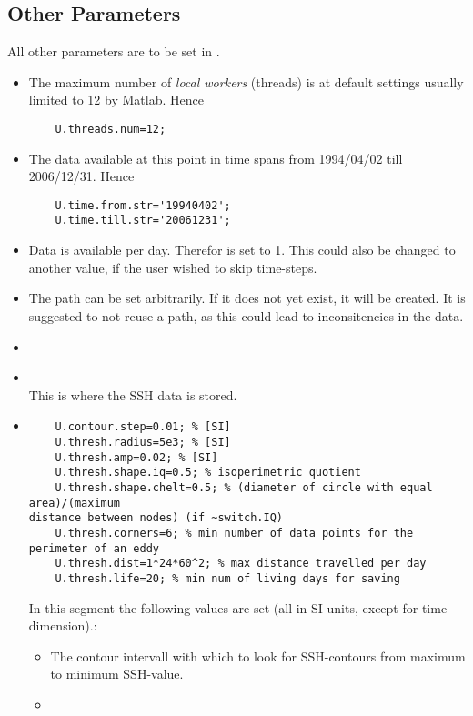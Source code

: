 \subsection{Other Parameters}
All other parameters are to be set in . 
\begin{itemize}
	\item 
	The maximum number of \textit{local workers} (threads) is at default settings
usually limited to 12 by Matlab. Hence 
 \begin{lstlisting}
 	U.threads.num=12;
 \end{lstlisting}
 \item 
 The data available at this point in time spans from 1994/04/02 till 2006/12/31.
Hence
 \begin{lstlisting}
 	U.time.from.str='19940402';
  	U.time.till.str='20061231';
 \end{lstlisting}
\item 
Data is available per day. Therefor  is set
to 1. This could also be changed to another value, if the user wished to skip
time-steps.
	\item \label{codeEx:data}
	The path  can be set arbitrarily. If it
does not yet exist, it will be created. It is suggested to not reuse a path,
as this could lead to inconsitencies in the data.
\item
{}
\item
{}\\
This is where the SSH data is stored.
\item
\begin{lstlisting}
	U.contour.step=0.01; % [SI]
	U.thresh.radius=5e3; % [SI]
	U.thresh.amp=0.02; % [SI]
	U.thresh.shape.iq=0.5; % isoperimetric quotient
	U.thresh.shape.chelt=0.5; % (diameter of circle with equal area)/(maximum
distance between nodes) (if ~switch.IQ) 
	U.thresh.corners=6; % min number of data points for the perimeter of an eddy
	U.thresh.dist=1*24*60^2; % max distance travelled per day
	U.thresh.life=20; % min num of living days for saving
\end{lstlisting}
In this segment the following values are set (all in SI-units, except for
time dimension).:
	\begin{itemize}
		\item 
		The contour intervall with which to look for SSH-contours from maximum to
	minimum SSH-value.
	\item

\end{itemize}
\end{itemize}

